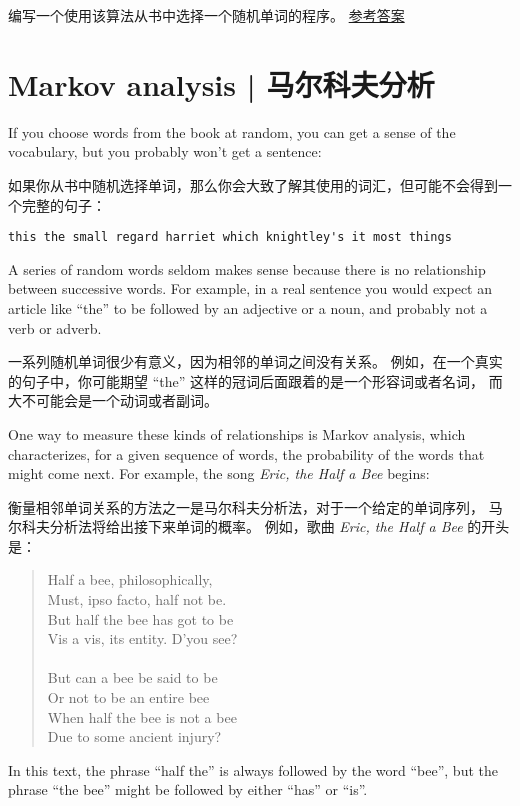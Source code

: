 编写一个使用该算法从书中选择一个随机单词的程序。 \href{http://thinkpython2.com/code/analyze_book3.py}{参考答案}


\section{Markov analysis  |  马尔科夫分析}
\label{markov}

If you choose words from the book at random, you can get a
sense of the vocabulary, but you probably won't get a sentence:

如果你从书中随机选择单词，那么你会大致了解其使用的词汇，但可能不会得到一个完整的句子：

\begin{lstlisting}
this the small regard harriet which knightley's it most things
\end{lstlisting}

%
A series of random words seldom makes sense because there
is no relationship between successive words.  For example, in
a real sentence you would expect an article like ``the'' to
be followed by an adjective or a noun, and probably not a verb
or adverb.

一系列随机单词很少有意义，因为相邻的单词之间没有关系。
例如，在一个真实的句子中，你可能期望 ``the'' 这样的冠词后面跟着的是一个形容词或者名词，
而大不可能会是一个动词或者副词。

One way to measure these kinds of relationships is Markov
analysis, which
characterizes, for a given sequence of words, the probability of the
words that might come next.  For example, the song {\em Eric, the Half a
  Bee} begins:

衡量相邻单词关系的方法之一是马尔科夫分析法，对于一个给定的单词序列，
马尔科夫分析法将给出接下来单词的概率。 例如，歌曲 {\em Eric, the Half a
Bee} 的开头是：

\begin{quote}
Half a bee, philosophically, \\
Must, ipso facto, half not be. \\
But half the bee has got to be \\
Vis a vis, its entity. D'you see? \\
\\
But can a bee be said to be \\
Or not to be an entire bee \\
When half the bee is not a bee \\
Due to some ancient injury? \\
\end{quote}
%
In this text,
the phrase ``half the'' is always followed by the word ``bee'',
but the phrase ``the bee'' might be followed by either
``has'' or ``is''.

